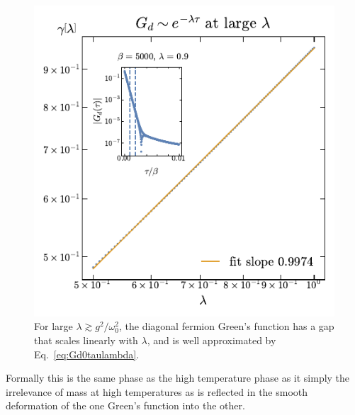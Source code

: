 \begin{figure}
    \centering
    \includegraphics[width=0.5\linewidth]{figures/chapter3/LARGElambdalinearscaling.pdf}
    \caption{For large $\lambda \gtrsim g^{2}/\omega_0^2$, 
    the diagonal fermion Green's function has a gap that scales linearly with $\lambda$, and is well approximated by Eq.~\ref{eq:Gd0taulambda}.}
    \label{fig:LargeLambdaGapScaling}
\end{figure}
%
Formally this is the same phase as the high temperature phase as it simply the irrelevance of mass at high temperatures as is reflected in the smooth deformation of the one Green's function into the other. 

